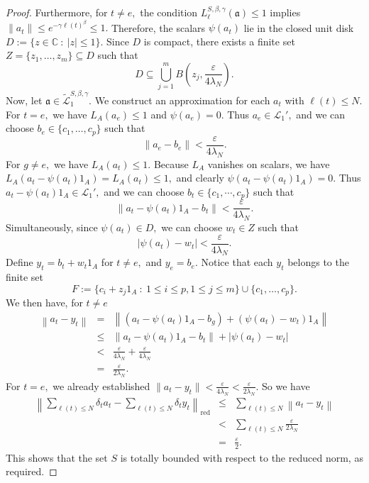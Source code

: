 \documentclass[10pt,a4paper]{amsart}
\newcommand{\Bea}{\begin{eqnarray*}}
\newcommand{\Eea}{\end{eqnarray*}}
\begin{document}
\begin{proof}
Furthermore, for $t \neq e,$ the condition $L_{\ell}^{S, \beta, \gamma}(\mathfrak{a}) \leq 1$ implies $\|a_t\| \leq e^{-\gamma \ell(t)^\beta} \leq 1.$ Therefore, the scalars $\psi (a_t)$ lie in the closed unit disk $D := \{z \in \mathbb{C} \ : \ |z| \leq 1\}.$ Since $D$ is compact, there exists a finite set $Z = \{z_1, \dots, z_m\} \subseteq D$ such that
$$D \subseteq \bigcup_{j=1}^m B\left(z_j, \frac{\varepsilon}{4 \lambda_N}\right).$$
Now, let $\mathfrak{a} \in \widetilde{\mathcal{L}}_1^{S, \beta, \gamma}.$ We construct an approximation for each $a_t$ with $\ell(t) \leq N.$ 
For $t = e,$ we have $L_A(a_e) \leq 1$ and $\psi (a_e) = 0.$ Thus $a_e \in \mathcal{L}_1',$ and we can choose $b_e \in \{c_1, \dots, c_p\}$ such that
$$\left \|a_e - b_e \right \| < \frac{\varepsilon}{4 \lambda_N}.$$
For $g \neq e,$ we have $L_A(a_t) \leq 1.$ Because $L_A$ vanishes on scalars, we have $L_A(a_t - \psi(a_t)1_A) = L_A(a_t) \leq 1,$ and clearly $\psi (a_t - \psi(a_t)1_A) = 0.$ Thus $a_t - \psi(a_t)1_A \in \mathcal{L}_1',$ and we can choose $b_t \in \{c_1, \cdots, c_p\}$ such that
$$\left \|a_t - \psi (a_t) 1_A - b_t \right \| < \frac {\varepsilon} {4 \lambda_N}.$$
Simultaneously, since $\psi(a_t) \in D,$ we can choose $w_t \in Z$ such that 
$$\left |\psi (a_t) - w_t \right | < \frac{\varepsilon}{4 \lambda_N}.$$
Define $y_t = b_t + w_t 1_A$ for $t \neq e,$ and $y_e = b_e.$ Notice that each $y_t$ belongs to the finite set
$$F := \{ c_i + z_j 1_A \ : \ 1 \leq i \leq p, 1 \leq j \leq m \} \cup \{c_1, \dots, c_p\}.$$ 
We then have, for $t \neq e$
\Bea
\left \| a_t - y_t \right \| & = & \left \| (a_t - \psi (a_t)1_A - b_g) + (\psi (a_t) - w_t)1_A \right \| \\
& \leq & \left \| a_t - \psi (a_t)1_A - b_t \right \| + \left | \psi (a_t) - w_t \right | \\
& < & \frac{\varepsilon}{4 \lambda_N} + \frac{\varepsilon}{4 \lambda_N} \\ & = & \frac{\varepsilon}{2 \lambda_N}.
\Eea
For $t = e,$ we already established $\|a_t - y_t\| < \frac{\varepsilon}{4 \lambda_N} < \frac {\varepsilon} {2 \lambda_N}.$
So we have
\Bea
\left \|\sum\limits_{\ell (t) \leq N} \delta_t a_t - \sum\limits_{\ell (t) \leq N} \delta_t y_t \right \|_{\mathrm{red}} & \leq & \sum\limits_{\ell (t) \leq N} \left \|a_t - y_t \right \| \\
& < & \sum\limits_{\ell (t) \leq N} \frac{\varepsilon}{2 \lambda_N} \\ & = & \frac{\varepsilon}{2}.
\Eea
This shows that the set $S$ is totally bounded with respect to the reduced norm, as required.
\end{proof}
\end{document}
